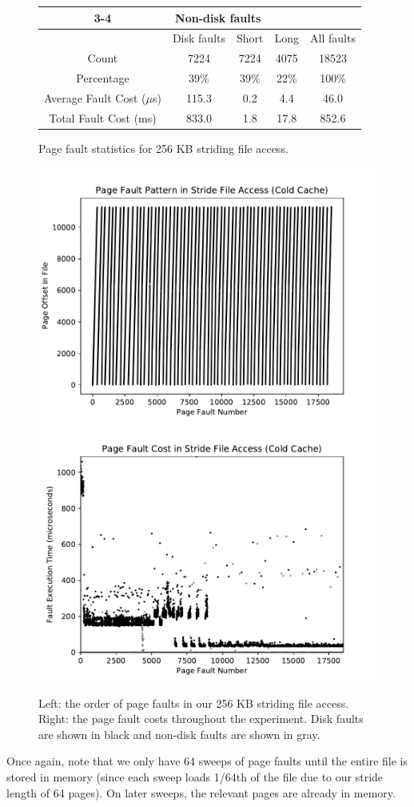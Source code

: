 \documentclass{article}
\begin{document}
	\vspace*{-10pt}
	\begin{figure}[ht!]
		\centering
		\begin{tabular}{|c|c|c|c|c|}
			\cline{3-4}\multicolumn{2}{}{}&\multicolumn{2}{|c|}{Non-disk faults}\\
			\hline & Disk faults & Short & Long & All faults\\\hline
			Count & 7224 & 7224 & 4075 & 18523\\
			Percentage & 39\% & 39\% & 22\% & 100\% \\
			Average Fault Cost ($\mu$s) & 115.3 & 0.2 & 4.4 & 46.0 \\
			Total Fault Cost (ms) & 833.0 & 1.8 & 17.8 & 852.6 \\\hline			
		\end{tabular}
		\caption{Page fault statistics for 256 KB striding file access.}
	\end{figure}\vspace*{-18pt}
	\begin{figure}[ht!]
		\centering
		\includegraphics[width=0.45\linewidth, trim=0.4cm 0.4cm 0.4cm 0.4cm]{figures/longstride1.pdf}
		\includegraphics[width=0.45\linewidth, trim=0.4cm 0.4cm 0.4cm 0.4cm]{figures/longstride2.pdf}
		\caption{Left: the order of page faults in our 256 KB striding file access. Right: the page fault costs throughout the experiment. Disk faults are shown in black and non-disk faults are shown in gray.}
	\end{figure}
	
	Once again, note that we only have 64 sweeps of page faults until the entire file is stored in memory (since each sweep loads 1/64th of the file due to our stride length of 64 pages). On later sweeps, the relevant pages are already in memory.\\
	
\end{document}
